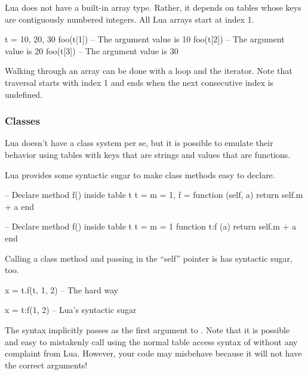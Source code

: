 Lua does not have a built-in array type.  Rather, it depends on tables whose
keys are contiguously numbered integers.  All Lua arrays start at index 1.

\begin{LuaCode}
t = { 10, 20, 30 }
foo(t[1]) -- The argument value is 10
foo(t[2]) -- The argument value is 20
foo(t[3]) -- The argument value is 30
\end{LuaCode}

Walking through an array can be done with a  loop and the
 iterator.  Note that traversal starts with index 1 and ends when
the next consecutive index is undefined.

\subsubsection{Classes}

Lua doesn't have a class system per se, but it is possible to emulate their
behavior using tables with keys that are strings and values that are functions.

Lua provides some syntactic sugar to make class methods easy to declare.

\begin{LuaCode}
-- Declare method f() inside table t
t = {
	m = 1,
	f = function (self, a)
		return self.m + a
	end
}
\end{LuaCode}

\begin{LuaCode}
-- Declare method f() inside table t
t = {
	m = 1
}
function t:f (a)
	return self.m + a
end
\end{LuaCode}

Calling a class method and passing in the ``self'' pointer is has syntactic
sugar, too.

\begin{LuaCode}
x = t.f(t, 1, 2) -- The hard way
\end{LuaCode}

\begin{LuaCode}
x = t:f(1, 2)    -- Lua's syntactic sugar
\end{LuaCode}

The syntax  implicitly passes  as the first argument
to .  Note that it is possible and easy to mistakenly call
 using the normal table access syntax of  without any
complaint from Lua.   However, your code may misbehave because it will not have
the correct arguments!

